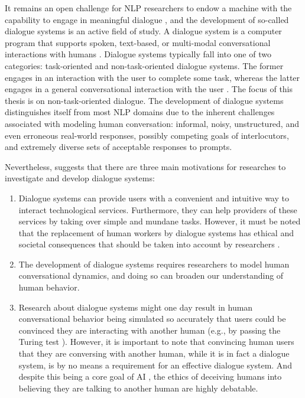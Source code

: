 

It remains an open challenge for NLP researchers to endow a machine with the capability to engage in meaningful dialogue \citep{burtsev-etal-2018-deeppavlov}, and the development of so-called dialogue systems is an active field of study.
A dialogue system is a computer program that supports spoken, text-based, or multi-modal conversational interactions with humans \citep{mctear2020conversational}.
Dialogue systems typically fall into one of two categories: task-oriented and non-task-oriented dialogue systems. The former engages in an interaction with the user to complete some task, whereas the latter engages in a general conversational interaction with the user \citep{Kushneryk2019IntelligentDS}. The focus of this thesis is on non-task-oriented dialogue.
The development of dialogue systems distinguishes itself from most NLP domains due to the inherent challenges associated with modeling human conversation: informal, noisy, unstructured, and even erroneous real-world responses, possibly competing goals of interlocutors, and extremely diverse sets of acceptable responses to prompts.

Nevertheless, \cite{mctear2020conversational} suggests that there are three main motivations for researches to investigate and develop dialogue systems:

\begin{enumerate}
    \item Dialogue systems can provide users with a convenient and intuitive way to interact technological services. Furthermore, they can help providers of these services by taking over simple and mundane tasks. However, it must be noted that the replacement of human workers by dialogue systems has ethical and societal consequences that should be taken into account by researchers \citep{ivanov2020impact}. 
    \item The development of dialogue systems requires researchers to model human conversational dynamics, and doing so can broaden our understanding of human behavior.
    \item Research about dialogue systems might one day result in human conversational behavior being simulated so accurately that users could be convinced they are interacting with another human (e.g., by passing the Turing test \citep{oppy2003turing}). However, it is important to note that convincing human users that they are conversing with another human, while it is in fact a dialogue system, is by no means a requirement for an effective dialogue system. And despite this being a core goal of AI \citep{zheng2019personalized}, the ethics of deceiving humans into believing they are talking to another human are highly debatable.
\end{enumerate}


